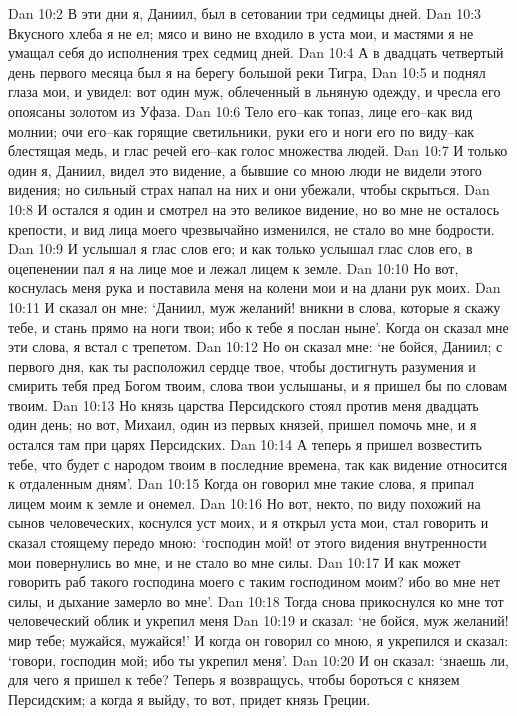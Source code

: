 Dan 10:2  В эти дни я, Даниил, был в сетовании три седмицы дней.
Dan 10:3  Вкусного хлеба я не ел; мясо и вино не входило в уста мои, и мастями я не умащал себя до исполнения трех седмиц дней.
Dan 10:4  А в двадцать четвертый день первого месяца был я на берегу большой реки Тигра,
Dan 10:5  и поднял глаза мои, и увидел: вот один муж, облеченный в льняную одежду, и чресла его опоясаны золотом из Уфаза.
Dan 10:6  Тело его--как топаз, лице его--как вид молнии; очи его--как горящие светильники, руки его и ноги его по виду--как блестящая медь, и глас речей его--как голос множества людей.
Dan 10:7  И только один я, Даниил, видел это видение, а бывшие со мною люди не видели этого видения; но сильный страх напал на них и они убежали, чтобы скрыться.
Dan 10:8  И остался я один и смотрел на это великое видение, но во мне не осталось крепости, и вид лица моего чрезвычайно изменился, не стало во мне бодрости.
Dan 10:9  И услышал я глас слов его; и как только услышал глас слов его, в оцепенении пал я на лице мое и лежал лицем к земле.
Dan 10:10  Но вот, коснулась меня рука и поставила меня на колени мои и на длани рук моих.
Dan 10:11  И сказал он мне: `Даниил, муж желаний! вникни в слова, которые я скажу тебе, и стань прямо на ноги твои; ибо к тебе я послан ныне'. Когда он сказал мне эти слова, я встал с трепетом.
Dan 10:12  Но он сказал мне: `не бойся, Даниил; с первого дня, как ты расположил сердце твое, чтобы достигнуть разумения и смирить тебя пред Богом твоим, слова твои услышаны, и я пришел бы по словам твоим.
Dan 10:13  Но князь царства Персидского стоял против меня двадцать один день; но вот, Михаил, один из первых князей, пришел помочь мне, и я остался там при царях Персидских.
Dan 10:14  А теперь я пришел возвестить тебе, что будет с народом твоим в последние времена, так как видение относится к отдаленным дням'.
Dan 10:15  Когда он говорил мне такие слова, я припал лицем моим к земле и онемел.
Dan 10:16  Но вот, некто, по виду похожий на сынов человеческих, коснулся уст моих, и я открыл уста мои, стал говорить и сказал стоящему передо мною: `господин мой! от этого видения внутренности мои повернулись во мне, и не стало во мне силы.
Dan 10:17  И как может говорить раб такого господина моего с таким господином моим? ибо во мне нет силы, и дыхание замерло во мне'.
Dan 10:18  Тогда снова прикоснулся ко мне тот человеческий облик и укрепил меня
Dan 10:19  и сказал: `не бойся, муж желаний! мир тебе; мужайся, мужайся!' И когда он говорил со мною, я укрепился и сказал: `говори, господин мой; ибо ты укрепил меня'.
Dan 10:20  И он сказал: `знаешь ли, для чего я пришел к тебе? Теперь я возвращусь, чтобы бороться с князем Персидским; а когда я выйду, то вот, придет князь Греции.
